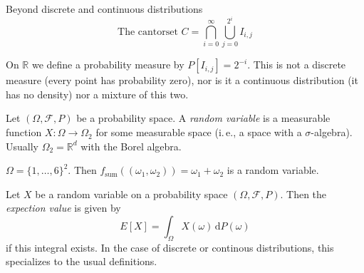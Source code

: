 \documentclass[compress]{beamer}
\newcommand{\RR}{\mathbb{R}}
\newcommand{\td}{\,\mathrm{d}}  %
\begin{document}
\begin{frame}{Beyond discrete and continuous distributions}
  \[\text{The cantorset } C = \bigcap_{i=0}^\infty \bigcup_{j=0}^{2^i} I_{i,j}\]
  \begin{center}
    \begin{tikzpicture}
      
    \end{tikzpicture}
  \end{center}
  \pause
  \begin{example}
    On $\RR$ we define a probability measure by $P[I_{i,j}] = 2^{-i}$. This is
    not a discrete measure (every point has probability zero), nor is it a
    continuous distribution (it has no density) nor a mixture of this two.
  \end{example}
\end{frame}

\begin{frame}
  \begin{definition}
    Let $(\Omega, \mathcal{F}, P)$ be a probability space. A \textit{random
      variable} is a measurable function $X: \Omega \to \Omega_2$ for some
    measurable space (i.\,e., a space with a $\sigma$-algebra). Usually
    $\Omega_2=\RR^d$ with the Borel algebra.
  \end{definition}

  \begin{example}
    $\Omega=\{1, \dots, 6\}^2$. Then $f_{\text{sum}}((\omega_1, \omega_2)) =
    \omega_1+ \omega_2$ is a random variable.
  \end{example}
\end{frame}

\begin{frame}
  \begin{definition}
    Let $X$ be a random variable on a probability space $(\Omega, \mathcal{F},
    P)$. Then the \textit{expection value} is given by
    \[
      E[X] = \int_{\Omega} X(\omega) \td P(\omega)
    \]
    if this integral exists. In the case of discrete or continous distributions,
    this specializes to the usual definitions.
  \end{definition}
\end{frame}
\end{document}
